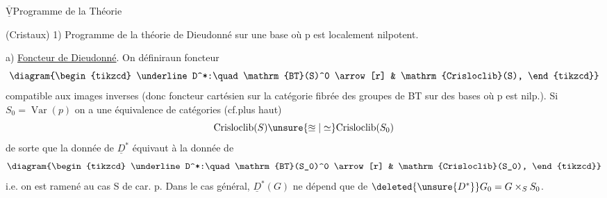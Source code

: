 $\underline{\overline{\mathrm V}}$\qquad Programme de la Théorie

(Cristaux)
1) Programme de la théorie de Dieudonné sur une base  où p est localement nilpotent.

 a) \uline{Foncteur de Dieudonné}. On  définiraun foncteur
\[
\diagram{\begin{tikzcd}
\underline D^*:\quad \mathrm{BT}(S)^0 \arrow[r] & \mathrm{Crisloclib}(S),
\end{tikzcd}}
\]
compatible aux images inverses (donc foncteur cartésien sur la catégorie fibrée des groupes de BT sur des bases où p est  nilp.). Si $S_0=\operatorname{Var}(p)$ on a une équivalence de catégories (cf.\qquad plus haut)
\[
\mathrm{Crisloclib}(S)\unsure{\approxeq|\simeq}\mathrm{Crisloclib}(S_0)
\]
de sorte que la donnée de $\underline D^*$ équivaut à la donnée de
\[
\diagram{\begin{tikzcd}
\underline D^*:\quad\mathrm{BT}(S_0)^0 \arrow[r] & \mathrm{Crisloclib}(S_0),
\end{tikzcd}}
\]
i.e. on est ramené  au cas S de car. p. 
Dans le cas général, $\underline D^*(G)$ ne dépend que de $\deleted{\unsure{D^*}}G_0=G\times_S S_0$.

